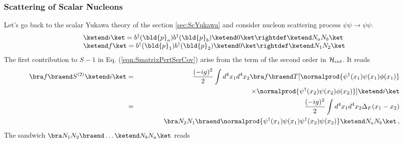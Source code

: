 \subsubsection{Scattering of Scalar Nucleons}
Let's go back to the scalar Yukawa theory of the section \ref{sec:ScYukawa} and 
consider nucleon scattering process $\psi \psi \to \psi \psi$.
\begin{eqnarray}
\begin{array}{l}
\ketend i \ket
=
b^\dagger(\bld{p}_a) b^\dagger(\bld{p}_b) \ketend 0 \ket
\rightdef
\ketend N_a N_b \ket
\\
\ketend f \ket
=
b^\dagger(\bld{p}_1) b^\dagger(\bld{p}_2) \ketend 0 \ket
\rightdef
\ketend N_1 N_2 \ket
\end{array}
\end{eqnarray}
The first contribution to $S - 1$ in Eq. (\ref{eqn:SmatrixPertSerCov}) arise from 
the term of the second order in ${\cal H}_{int}$. It reads
\begin{eqnarray}
\bra f \braend S^{(2)} \ketend i \ket
&=&
\frac{(-i g)^2}{2} \int d^4 x_1 d^4 x_2
\bra f \braend
T[
\normalprod{\psi^\dagger(x_1) \psi(x_1) \phi(x_1)}
\nonumber\\
&&
\hspace{35mm}
\times
\normalprod{\psi^\dagger(x_2) \psi(x_2) \phi(x_2)}
]
\ketend i \ket
\nonumber\\
&=&
\frac{(-i g)^2}{2} \int d^4 x_1 d^4 x_2
\Delta_F(x_1 - x_2)
\nonumber\\
&&
\hspace{12mm}
\bra N_2 N_1 \braend
\normalprod{
\psi^\dagger(x_1) \psi(x_1) 
\psi^\dagger(x_2) \psi(x_2)
}
\ketend N_a N_b \ket\,,
\nonumber\\
\label{eqn:scYS2ndord}
\end{eqnarray}
The sandwich $\bra N_1 N_2 \braend \dots \ketend N_b N_a \ket$ reads
